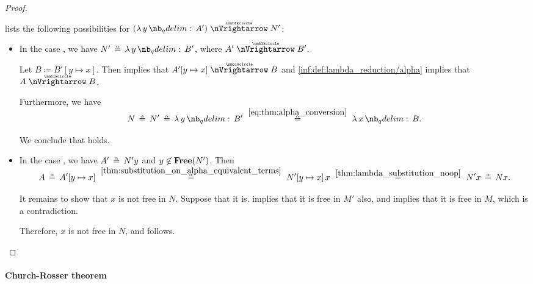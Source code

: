 \begin{proof}
\begin{itemize}
     lists the following possibilities for \( (\qabs y A') \ppred N' \):
    \begin{itemize}
      \item In the case , we have \( N' \aequiv \qabs y B' \), where \( A' \ppred B' \).

      Let \( B \coloneqq B'[y \mapsto x] \). Then  implies that \( A'[y \mapsto x] \ppred B \) and \ref{inf:def:lambda_reduction/alpha} implies that \( A \ppred B \).

      Furthermore, we have
      \begin{equation*}
        N
        \aequiv
        N'
        \aequiv
        \qabs y B'
        \reloset {\eqref{eq:thm:alpha_conversion}} \aequiv
        \qabs x B.
      \end{equation*}

      We conclude that  holds.

      \item In the case , we have \( A' \aequiv N'y \) and \( y \not\in \op*{Free}(N') \). Then
      \begin{equation*}
        A
        \aequiv
        A'[y \mapsto x]
        \reloset {\ref{thm:substitution_on_alpha_equivalent_terms}} \aequiv
        N'[y \mapsto x] \thinspace x
        \reloset {\ref{thm:lambda_substitution_noop}} =
        N' x
        \aequiv
        N x.
      \end{equation*}

      It remains to show that \( x \) is not free in \( N \). Suppose that it is.  implies that it is free in \( M' \) also, and  implies that it is free in \( M \), which is a contradiction.

      Therefore, \( x \) is not free in \( N \), and  follows.
    \end{itemize}
  \end{itemize}
\end{proof}

\paragraph{Church-Rosser theorem}\hfill

